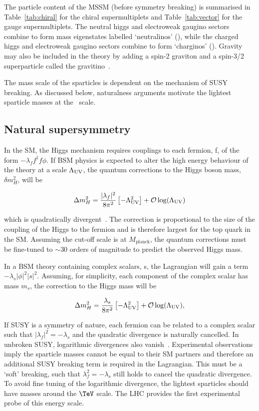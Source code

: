 The particle content of the MSSM (before symmetry breaking) 
is summarised in Table~\ref{tab:chiral} for the chiral supermultiplets
and Table~\ref{tab:vector} for the gauge supermultiplets. The neutral higgs and electroweak 
gaugino sectors combine to form mass eigenstates labelled `neutralinos' 
(\chiz), while the charged higgs and electroweak gaugino sectors combine
to form `charginos' (\chip). Gravity may also be included in the theory
by adding a spin-2 graviton and a spin-3/2 superparticle
called the gravitino~\cite{SUSYP}. 

The mass scale of the sparticles is dependent on the mechanism of SUSY breaking.
As discussed below, naturalness arguments motivate the lightest sparticle masses 
at the \TeV~scale.

\subsection{Natural supersymmetry}
\label{sec:natSUSY}
In the SM, the Higgs mechanism requires couplings to each fermion, f, of the form $-\lambda_{f}f^{\dagger}f\phi$. If BSM physics
is expected to alter the high energy behaviour of the theory at a scale $\Lambda_{\mathrm{UV}}$, the quantum corrections 
to the Higgs boson mass, $\delta m^2_{H}$, will be 

\begin{equation}
\Delta m^2_H =  \frac{|\lambda_f|^2}{8\pi^2}\left[-\Lambda^2_{\text{UV}}\right] + \mathcal{O}\log(\Lambda_{\mathrm{UV}})
\end{equation}

which is quadratically divergent~\cite{HMSSM}. The correction is proportional to the size of the coupling of the Higgs to the fermion 
and is therefore largest for the top quark in the SM. Assuming the cut-off scale is at $M_{\text{planck}}$, the quantum 
corrections must be fine-tuned to $\sim 30$ orders of magnitude to predict the observed Higgs mass. 

In a BSM theory containing complex scalars, s, the Lagrangian will gain a term $-\lambda_{s}|\phi|^2|s|^2$.
Assuming, for simplicity, each component of the complex scalar has mass $m_s$, the correction to the Higgs mass will be

\begin{equation}
\label{equ:corrHiggsSusy}
\Delta m^2_H =  \frac{\lambda_s}{8\pi^2}\left[-\Lambda^2_{\text{UV}}\right] + \mathcal{O}\log(\Lambda_{\mathrm{UV}}),
\end{equation}

If SUSY is a symmetry of nature, each fermion can be related to a complex scalar such that $|\lambda_f|^2 = -\lambda_s$ 
and the quadratic divergence is naturally cancelled. In unbroken SUSY, logarithmic divergences also vanish~\cite{HMSSM}. 
Experimental observations imply the sparticle masses cannot be equal to their SM partners and
therefore an additional SUSY breaking term is required in the Lagrangian. This must be a `soft' breaking,
such that $\lambda_f^2 = -\lambda_s$ still holds to cancel the quadratic divergence.
To avoid fine tuning of the logarithmic divergence, the lightest sparticles should have 
masses around the $\TeV$ scale. The LHC provides the first experimental probe of this energy scale.

